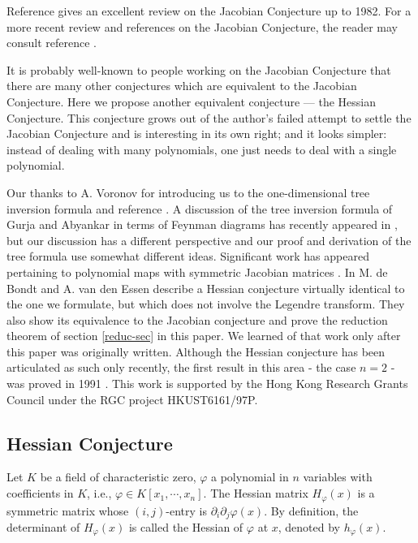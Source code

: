 \documentclass{article}
\newtheorem{main theorem}[defn]{Main Theorem}
\begin{document}
Reference \cite{BCW82} gives an excellent review on the Jacobian
Conjecture up to 1982. For a more recent review and references on
the Jacobian Conjecture, the reader may consult reference
\cite{Ess01}.

\vskip 10pt It is probably well-known to people working on the
Jacobian Conjecture that there are many other conjectures which
are equivalent to the Jacobian Conjecture. Here we propose another
equivalent conjecture --- the Hessian Conjecture. This conjecture
grows out of the author's failed attempt to settle the Jacobian
Conjecture and is interesting in its own right; and it looks
simpler: instead of dealing with many polynomials, one just needs
to deal with a single polynomial.

\vskip 10pt Our thanks to  A. Voronov for introducing us to the
one-dimensional tree inversion formula and reference \cite{BCW82}.
A discussion of the tree inversion formula of Gurja and Abyankar
in terms of Feynman diagrams has recently appeared in
\cite{Abd02a,Abd02b}, but our discussion has a different
perspective and our  proof and derivation of the tree formula use
somewhat different ideas. Significant work has appeared pertaining
to polynomial maps with symmetric Jacobian matrices
\cite{JC4SymmetricJ,NilpotentSymmetric,SymmetricReduction}. In
\cite{SymmetricReduction} M. de Bondt and A. van den Essen
describe a Hessian conjecture virtually identical to the one we
formulate, but which does not involve the Legendre transform. They
also show its equivalence to the Jacobian conjecture and prove the
reduction theorem of section \ref{reduc-sec} in this paper. We
learned of that work only after this paper was originally written.
Although the Hessian conjecture has been articulated as such only
recently, the first result in this area - the case $n=2$ - was
proved in 1991 \cite{SymmetricJacobian}. This work is supported by
the Hong Kong Research Grants Council under the RGC project
HKUST6161/97P.


\subsection{ Hessian Conjecture}
Let $K$ be a field of characteristic zero, $\varphi$ a polynomial
in $n$ variables with coefficients in $K$, i.e., $\varphi\in
K[x_1,\cdots, x_n]$. The Hessian matrix $H_\varphi(x)$ is a
symmetric matrix whose $(i,j)$-entry is
$\partial_i\partial_j\varphi(x)$. By definition, the determinant
of $H_\varphi(x)$ is called the Hessian of $\varphi$ at $x$,
denoted by $h_\varphi(x)$.
\end{document}
